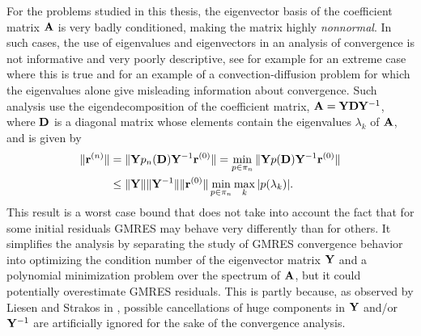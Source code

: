 
For the problems studied in this thesis, the eigenvector basis of the
coefficient matrix $\mathbf{A}$ is very badly conditioned, making the matrix highly
\emph{nonnormal}. In such cases, the use of eigenvalues and eigenvectors in an
analysis of convergence is not informative and very poorly descriptive, see for
example \cite{GreStrPta96} for an extreme case where this is true and \cite{Ern00} for an example of a convection-diffusion problem for which the eigenvalues alone give misleading information about convergence.
Such analysis use the eigendecomposition of the coefficient matrix,
$\mathbf{A}=\mathbf{Y}\mathbf{D}\mathbf{Y}^{-1}$, where $\mathbf{D}$ is a diagonal matrix whose elements contain the
eigenvalues $\lambda_k$ of $\mathbf{A}$, and is given by
\begin{align}
\|\mathbf{r}^{(n)}\|&=\|\mathbf{Y} p_n(\mathbf{D}) \mathbf{Y}^{-1}\mathbf{r}^{(0)}\|=\min_{p\in \pi_n}\|\mathbf{Y} p(\mathbf{D})\mathbf{Y}^{-1}\mathbf{r}^{(0)}\|\\
&\leq\|\mathbf{Y}\|\|\mathbf{Y}^{-1}\|\|\mathbf{r}^{(0)}\|\min_{p \in \pi_n}\max_k|p(\lambda_k)|.
\end{align}
This result is a worst case bound that does not take into account the fact that
for some initial residuals GMRES may behave very differently than for others.
It simplifies the analysis by separating the study of GMRES convergence
behavior into optimizing the condition number of the eigenvector matrix $\mathbf{Y}$ and
a polynomial minimization problem over the spectrum of $\mathbf{A}$, but it could
potentially overestimate GMRES residuals. This is partly because, as observed
by Liesen and Strakos in \cite{LieStr03}, possible cancellations of huge
components in $\mathbf{Y}$ and/or $\mathbf{Y}^{-1}$ are artificially ignored for the sake of the
convergence analysis.


